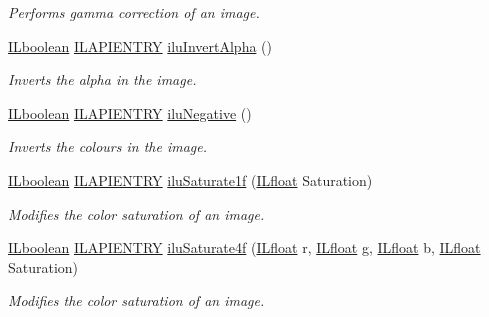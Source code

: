 \begin{DoxyCompactItemize}
\begin{DoxyCompactList}\small\item\em Performs gamma correction of an image. \end{DoxyCompactList}\item 
\hyperlink{group__il__types_gaa6aa7c95cfdc06b4d8601ef832b7bb0a}{I\+Lboolean} \hyperlink{_i_l_8h_a69c08a8d06df986f7e46f209d131ef2f}{I\+L\+A\+P\+I\+E\+N\+T\+R\+Y} \hyperlink{group__ilu__colour_ga0e3910809ea18e77a83cee05e12613ef}{ilu\+Invert\+Alpha} ()
\begin{DoxyCompactList}\small\item\em Inverts the alpha in the image. \end{DoxyCompactList}\item 
\hyperlink{group__il__types_gaa6aa7c95cfdc06b4d8601ef832b7bb0a}{I\+Lboolean} \hyperlink{_i_l_8h_a69c08a8d06df986f7e46f209d131ef2f}{I\+L\+A\+P\+I\+E\+N\+T\+R\+Y} \hyperlink{group__ilu__colour_ga9606e892974b44e5457bc6f95de0970d}{ilu\+Negative} ()
\begin{DoxyCompactList}\small\item\em Inverts the colours in the image. \end{DoxyCompactList}\item 
\hyperlink{group__il__types_gaa6aa7c95cfdc06b4d8601ef832b7bb0a}{I\+Lboolean} \hyperlink{_i_l_8h_a69c08a8d06df986f7e46f209d131ef2f}{I\+L\+A\+P\+I\+E\+N\+T\+R\+Y} \hyperlink{group__ilu__colour_gaa8f7b3bdc21492fddac12dd823051c3b}{ilu\+Saturate1f} (\hyperlink{group__il__types_ga376156c9461893f4b1a5de9579dc86f2}{I\+Lfloat} Saturation)
\begin{DoxyCompactList}\small\item\em Modifies the color saturation of an image. \end{DoxyCompactList}\item 
\hyperlink{group__il__types_gaa6aa7c95cfdc06b4d8601ef832b7bb0a}{I\+Lboolean} \hyperlink{_i_l_8h_a69c08a8d06df986f7e46f209d131ef2f}{I\+L\+A\+P\+I\+E\+N\+T\+R\+Y} \hyperlink{group__ilu__colour_gac117ee194f9075d2600f147e08a59251}{ilu\+Saturate4f} (\hyperlink{group__il__types_ga376156c9461893f4b1a5de9579dc86f2}{I\+Lfloat} r, \hyperlink{group__il__types_ga376156c9461893f4b1a5de9579dc86f2}{I\+Lfloat} g, \hyperlink{group__il__types_ga376156c9461893f4b1a5de9579dc86f2}{I\+Lfloat} b, \hyperlink{group__il__types_ga376156c9461893f4b1a5de9579dc86f2}{I\+Lfloat} Saturation)
\begin{DoxyCompactList}\small\item\em Modifies the color saturation of an image. \end{DoxyCompactList}\item 

\end{DoxyCompactItemize}
